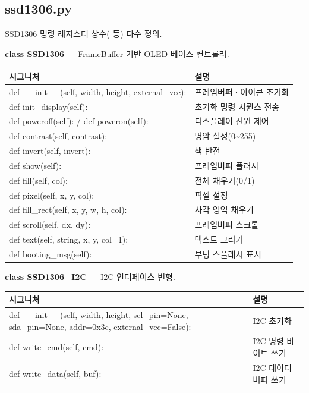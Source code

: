 \subsection{ssd1306.py}

\noindent SSD1306 명령 레지스터 상수( 등) 다수 정의.

\noindent\textbf{class SSD1306} --- FrameBuffer 기반 OLED 베이스 컨트롤러.

\begin{longtable}{S{7.6cm} L{6.4cm}}
\toprule
{}\normalfont\sffamily\bfseries 시그니처 & \normalfont\sffamily\bfseries 설명 \\
\midrule
\endhead
def \_\_init\_\_(self, width, height, external\_vcc): & 프레임버퍼\textbf{·}아이콘 초기화 \\
def init\_display(self): & 초기화 명령 시퀀스 전송 \\
def poweroff(self): / def poweron(self): & 디스플레이 전원 제어 \\
def contrast(self, contrast): & 명암 설정(0\textasciitilde 255) \\
def invert(self, invert): & 색 반전 \\
def show(self): & 프레임버퍼 플러시 \\
def fill(self, col): & 전체 채우기(0/1) \\
def pixel(self, x, y, col): & 픽셀 설정 \\
def fill\_rect(self, x, y, w, h, col): & 사각 영역 채우기 \\
def scroll(self, dx, dy): & 프레임버퍼 스크롤 \\
def text(self, string, x, y, col=1): & 텍스트 그리기 \\
def booting\_msg(self): & 부팅 스플래시 표시 \\
\bottomrule
\end{longtable}

\noindent\textbf{class SSD1306\_I2C} --- I2C 인터페이스 변형.

\begin{longtable}{S{9.6cm} L{4.4cm}}
\toprule
{}\normalfont\sffamily\bfseries 시그니처 & \normalfont\sffamily\bfseries 설명 \\
\midrule
\endhead
def \_\_init\_\_(self, width, height, scl\_pin=None, sda\_pin=None, addr=0x3c, external\_vcc=False): & I2C 초기화 \\
def write\_cmd(self, cmd): & I2C 명령 바이트 쓰기 \\
def write\_data(self, buf): & I2C 데이터 버퍼 쓰기 \\
\bottomrule
\end{longtable}

